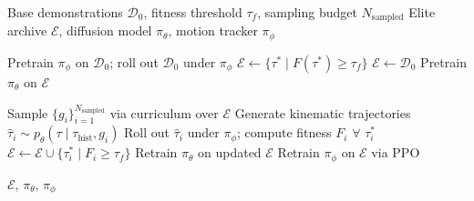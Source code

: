 \documentclass{article}
\newcommand{\papertitle}{Humanoid-DART}
\begin{document}
\begin{algorithm}[t]
\caption{\papertitle}
\label{alg:dart}
\begin{algorithmic}[1]

\Require Base demonstrations $\mathcal{D}_0$, fitness threshold $\tau_f$, 
         sampling budget $N_{\text{sampled}}$
\Ensure  Elite archive $\mathcal{E}$, diffusion model $\pi_\theta$, 
         motion tracker $\pi_\phi$

    \State Pretrain $\pi_\phi$ on $\mathcal{D}_0$; roll out $\mathcal{D}_0$ under $\pi_\phi$
    \State $\mathcal{E} \leftarrow \{\tau^* \mid F(\tau^*) \geq \tau_f\}$
\Else
    \State $\mathcal{E} \leftarrow \mathcal{D}_0$
\EndIf
\State Pretrain $\pi_\theta$ on $\mathcal{E}$

        \State Sample $\{g_i\}_{i=1}^{N_{\text{sampled}}}$ via curriculum over $\mathcal{E}$
        \State Generate kinematic trajectories 
               $\hat{\tau}_i \sim p_\theta(\tau \mid \tau_{\text{hist}}, g_i)$
        \State Roll out $\hat{\tau}_i$ under $\pi_\phi$; 
               compute fitness $F_i$ $\forall$ $\tau^*_i$
        \State $\mathcal{E} \leftarrow \mathcal{E} \cup \{\tau^*_i \mid F_i \geq \tau_f\}$
        \State Retrain $\pi_\theta$ on updated $\mathcal{E}$
    \EndFor
    \State Retrain $\pi_\phi$ on $\mathcal{E}$ via PPO
\EndFor

\State \Return $\mathcal{E},\, \pi_\theta,\, \pi_\phi$

\end{algorithmic}
\end{algorithm}
\end{document}
